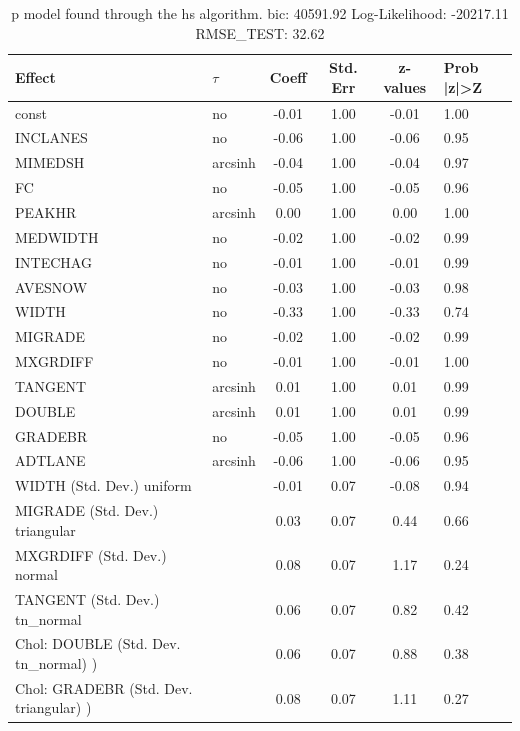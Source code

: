 \begin{table}
	\caption{p model found through the hs algorithm. bic: 40591.92 Log-Likelihood: -20217.11 RMSE_TEST: 32.62}
	\begin{center}
		\begin{tabular}{|l|l|c|c|c|l|}
			\hline
			Effect & $\tau$ & Coeff & Std. Err & z-values & Prob |z|>Z \\
			\hline
			const & no & -0.01 & 1.00 & -0.01 & 1.00 \\
			\hline
			INCLANES & no & -0.06 & 1.00 & -0.06 & 0.95 \\
			\hline
			MIMEDSH & arcsinh & -0.04 & 1.00 & -0.04 & 0.97 \\
			\hline
			FC & no & -0.05 & 1.00 & -0.05 & 0.96 \\
			\hline
			PEAKHR & arcsinh & 0.00 & 1.00 & 0.00 & 1.00 \\
			\hline
			MEDWIDTH & no & -0.02 & 1.00 & -0.02 & 0.99 \\
			\hline
			INTECHAG & no & -0.01 & 1.00 & -0.01 & 0.99 \\
			\hline
			AVESNOW & no & -0.03 & 1.00 & -0.03 & 0.98 \\
			\hline
			WIDTH & no & -0.33 & 1.00 & -0.33 & 0.74 \\
			\hline
			MIGRADE & no & -0.02 & 1.00 & -0.02 & 0.99 \\
			\hline
			MXGRDIFF & no & -0.01 & 1.00 & -0.01 & 1.00 \\
			\hline
			TANGENT & arcsinh & 0.01 & 1.00 & 0.01 & 0.99 \\
			\hline
			DOUBLE & arcsinh & 0.01 & 1.00 & 0.01 & 0.99 \\
			\hline
			GRADEBR & no & -0.05 & 1.00 & -0.05 & 0.96 \\
			\hline
			ADTLANE & arcsinh & -0.06 & 1.00 & -0.06 & 0.95 \\
			\hline
			WIDTH (Std. Dev.) uniform &  & -0.01 & 0.07 & -0.08 & 0.94 \\
			\hline
			MIGRADE (Std. Dev.) triangular &  & 0.03 & 0.07 & 0.44 & 0.66 \\
			\hline
			MXGRDIFF (Std. Dev.) normal &  & 0.08 & 0.07 & 1.17 & 0.24 \\
			\hline
			TANGENT (Std. Dev.) tn_normal &  & 0.06 & 0.07 & 0.82 & 0.42 \\
			\hline
			 Chol: DOUBLE (Std. Dev. tn_normal) ) &  & 0.06 & 0.07 & 0.88 & 0.38 \\
			\hline
			 Chol: GRADEBR (Std. Dev. triangular) ) &  & 0.08 & 0.07 & 1.11 & 0.27 \\

\end{tabular}
\end{center}
\end{table}
